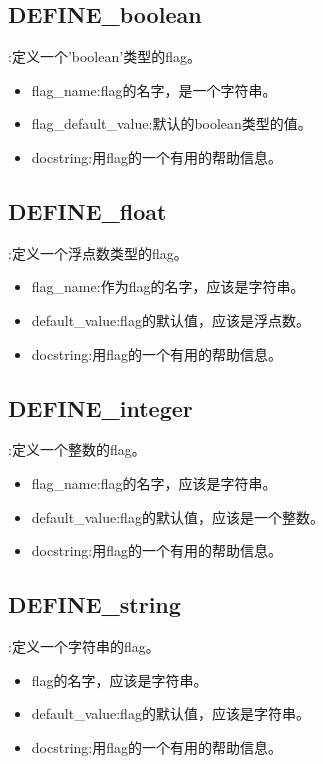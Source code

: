 \subsection{DEFINE\_boolean}:定义一个'boolean'类型的flag。
\begin{itemize}
\item flag\_name:flag的名字，是一个字符串。
\item flag\_default\_value:默认的boolean类型的值。
\item docstring:用flag的一个有用的帮助信息。
\end{itemize}
\subsection{DEFINE\_float}:定义一个浮点数类型的flag。
\begin{itemize}
\item flag\_name:作为flag的名字，应该是字符串。
\item default\_value:flag的默认值，应该是浮点数。
\item docstring:用flag的一个有用的帮助信息。
\end{itemize}
\subsection{DEFINE\_integer}:定义一个整数的flag。
\begin{itemize}
\item flag\_name:flag的名字，应该是字符串。
\item default\_value:flag的默认值，应该是一个整数。
\item docstring:用flag的一个有用的帮助信息。
\end{itemize}
\subsection{DEFINE\_string}:定义一个字符串的flag。
\begin{itemize}
\item flag的名字，应该是字符串。
\item default\_value:flag的默认值，应该是字符串。
\item docstring:用flag的一个有用的帮助信息。
\end{itemize}
